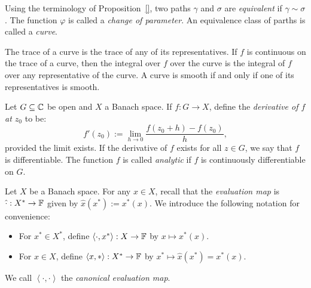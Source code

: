 \documentclass[reqno]{amsart}
\begin{document}
\begin{definition}
	Using the terminology of Proposition~\ref{}, two paths $\gamma$ and $\sigma$ are \emph{equivalent} if $\gamma \sim \sigma$. The function $\varphi$ is called a \emph{change of parameter}. An equivalence class of parths is called a \emph{curve}.
\end{definition}

\begin{remark}
	The trace of a curve is the trace of any of its representatives. If $f$ is continuous on the trace of a curve, then the integral over $f$ over the curve is the integral of $f$ over any representative of the curve. A curve is smooth if and only if one of its representatives is smooth. 
\end{remark}

\begin{definition}
	Let $G \subseteq \mathbb{C}$ be open and $X$ a Banach space. If $f:G \rightarrow X$, define the \emph{derivative of $f$ at $z_0$} to be:
	\[
		f'(z_0) := \lim_{h \rightarrow 0}\frac{f(z_0 + h) - f(z_0)}{h},
	\] 
	provided the limit exists. If the derivative of $f$ exists for all $z \in G$, we say that $f$ is differentiable. The function $f$ is called \emph{analytic} if $f$ is continuously differentiable on $G$.
\end{definition}

\begin{remark}
	Let $X$ be a Banach space. For any $x \in X$, recall that the \emph{evaluation map} is $\hat{\cdot}:X^\ast \rightarrow \mathbb{F}$ given by $\hat{x}(x^\ast) := x^\ast(x)$. We introduce the following notation for convenience:
	\mbox{}
	\begin{itemize}[itemsep=1pt,topsep=3pt]
		\item For $x^\ast \in X^\ast$, define $\left<\cdot, x^\ast \right>:X \rightarrow \mathbb{F}$ by $x \mapsto x^\ast(x)$.
		\item For $x \in X$, define $\left<x,\ast \right> :X^\ast \rightarrow \mathbb{F}$ by $x^\ast \mapsto \hat{x}(x^\ast) = x^\ast (x)$.
	\end{itemize}
	We call $\left<\cdot,\cdot \right>$ the \emph{canonical evaluation map}.
\end{remark}
\end{document}
